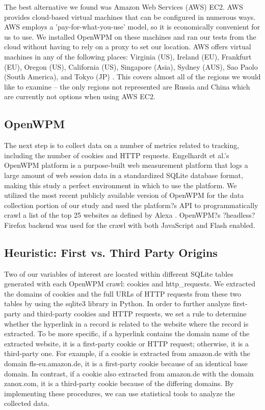 \documentclass[12pt,draft,onecolumn]{IEEEtran}
\begin{document}
The best alternative we found was Amazon Web Services (AWS) EC2. AWS provides cloud-based virtual machines that can be configured in numerous ways. AWS employs a 'pay-for-what-you-use' model, so it is economically convenient for us to use. We installed OpenWPM on these machines and ran our tests from the cloud without having to rely on a proxy to set our location. AWS offers virtual machines in any of the following places: Virginia (US), Ireland (EU), Frankfurt (EU), Oregon (US), California (US), Singapore (Asia), Sydney (AUS), Sao Paolo (South America), and Tokyo (JP) \cite{amazonregion}. This covers almost all of the regions we would like to examine -- the only regions not represented are Russia and China which are currently not options when using AWS EC2.

\subsection{OpenWPM}

The next step is to collect data on a number of metrics related to tracking, including the number of cookies and HTTP requests. Engelhardt et al.'s OpenWPM platform is a purpose-built web measurement platform that logs a large amount of web session data in a standardized SQLite database format, making this study a perfect environment in which to use the platform. We utilized the most recent publicly available version of OpenWPM for the data collection portion of our study and used the platform?s API to programmatically crawl a list of the top 25 websites as defined by Alexa \cite{Alexa}. OpenWPM?s ?headless? Firefox backend was used for the crawl with both JavaScript and Flash enabled.

\subsection{Heuristic: First vs. Third Party Origins}

Two of our variables of interest are located within different SQLite tables generated with each OpenWPM crawl: cookies and http\_requests. We extracted the domains of cookies and the full URLs of HTTP requests from these two tables by using the sqlite3 library in Python. In order to further analyze first-party and third-party cookies and HTTP requests, we set a rule to determine whether the hyperlink in a record is related to the website where the record is extracted. To be more specific, if a hyperlink contains the domain name of the extracted website, it is a first-party cookie or HTTP request; otherwise, it is a third-party one. For example, if a cookie is extracted from amazon.de with the domain fls-eu.amazon.de, it is a first-party cookie because of an identical base domain. In contrast, if a cookie also extracted from amazon.de with the domain zanox.com, it is a third-party cookie because of the differing domains. By implementing these procedures, we can use statistical tools to analyze the collected data.
\end{document}
